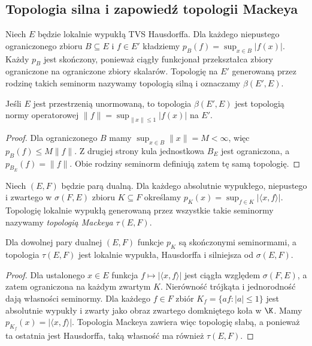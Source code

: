 \subsection{Topologia silna i zapowiedź topologii Mackeya}

\begin{definicja}
\label{def:silna-dualna}
Niech $E$ będzie lokalnie wypukłą TVS Hausdorffa.
Dla każdego niepustego ograniczonego zbioru $B\subseteq E$ i $f\in E'$
kładziemy $p_B(f)=\sup_{x\in B}|f(x)|$.
Każdy $p_B$ jest skończony, ponieważ ciągły funkcjonał
przekształca zbiory ograniczone na ograniczone zbiory skalarów.
Topologię na $E'$ generowaną przez rodzinę takich seminorm
nazywamy topologią silną i oznaczamy $\beta(E',E)$.
\end{definicja}
\begin{stwierdzenie}
\label{prop:silna-unormowana}
Jeśli $E$ jest przestrzenią unormowaną, to topologia
$\beta(E',E)$ jest topologią normy operatorowej
$\|f\|=\sup_{\|x\|\le1}|f(x)|$ na $E'$.
\end{stwierdzenie}
\begin{proof}
Dla ograniczonego $B$ mamy
$\sup_{x\in B}\|x\|=M<\infty$, więc
$p_B(f)\le M\|f\|$. Z drugiej strony kula jednostkowa
$B_E$ jest ograniczona, a $p_{B_E}(f)=\|f\|$.
Obie rodziny seminorm definiują zatem tę samą topologię.
\end{proof}

\begin{definicja}\label{def:mackey}
Niech $(E,F)$ będzie parą dualną. Dla każdego absolutnie
wypukłego, niepustego i zwartego w $\sigma(F,E)$ zbioru $K\subseteq F$
określamy $p_K(x)=\sup_{f\in K}|\langle x,f\rangle|$.
Topologię lokalnie wypukłą generowaną przez wszystkie takie
seminormy nazywamy \emph{topologią Mackeya} $\tau(E,F)$.
\end{definicja}

\begin{stwierdzenie}\label{prop:mackey-basic}
Dla dowolnej pary dualnej $(E,F)$ funkcje $p_K$ są
skończonymi seminormami, a topologia $\tau(E,F)$
jest lokalnie wypukła, Hausdorffa i silniejsza od
$\sigma(E,F)$.
\end{stwierdzenie}
\begin{proof}
Dla ustalonego $x\in E$ funkcja
$f\mapsto|\langle x,f\rangle|$ jest ciągła względem
$\sigma(F,E)$, a zatem ograniczona na każdym zwartym $K$.
Nierówność trójkąta i jednorodność dają własności seminormy.
Dla każdego $f\in F$ zbiór
$K_f=\{af:|a|\le1\}$ jest absolutnie wypukły i zwarty
jako obraz zwartego domkniętego koła w $\K$.
Mamy $p_{K_f}(x)=|\langle x,f\rangle|$.
Topologia Mackeya zawiera więc topologię słabą,
a ponieważ ta ostatnia jest Hausdorffa, taką własność
ma również $\tau(E,F)$.
\end{proof}

